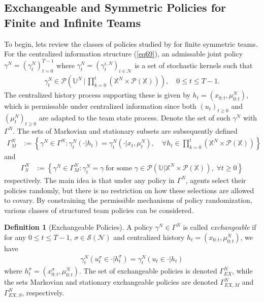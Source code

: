 \documentclass[12pt, oneside]{report}
\newcommand{\mbb}[1]{\mathbb{#1}}
\newcommand{\1}[1]{\mathbbm{1}_{\{#1\}}}
\newcommand{\mc}[1]{\mathcal{#1}}
\theoremstyle{definition}
\newtheorem{definition}[theorem]{Definition}
\begin{document}
\subsection{Exchangeable and Symmetric Policies for Finite and Infinite Teams}
To begin, lets review the classes of policies studied by
\cite{Sanjari_Saldi_Yüksel_2024} for finite symmetric teams. For the centralized
information structure (\ref{eq69}), an admissable joint policy
$\gamma^N=(\gamma^N_t)_{t=0}^{T-1}$ where
$\gamma^N_t=(\gamma^{i,N}_t)_{i\in\mc{N}}$ is a set of stochastic kernels such
that
\begin{align}
    \gamma^N_t\in\mc{P}\left(\mbb{U}^N\,\bigg|\,\prod_{k=0}^t(\mbb{X}^N\times\mc{P}(\mbb{X}))\right),\quad 0\leq t\leq T-1.
\end{align}
The centralized history process supporting these is given by
$h_t=(x_{0:t},\mu^N_{0:t})$, which is permissable under centralized information
since both $(u_t)_{t\geq 0}$ and $(\mu^N_t)_{t\geq 0}$ are adapted to the team
state process. Denote the set of such $\gamma^N$ with $\Gamma^N$. The sets of
Markovian and stationary subsets are subsequently defined
\begin{align}
    \Gamma^N_M&:=\left\{\gamma^N\in\Gamma^N:\gamma^N_t(\cdot|h_t)=\gamma^N_t(\cdot|x_t,\mu^N_t),\quad\forall h_t\in\prod_{k=0}^t(\mbb{X}^N\times\mc{P}(\mbb{X}))\right\}
\end{align}
and
\begin{align}
    \Gamma^N_S&:=\left\{\gamma^N\in\Gamma^N_M:\gamma^N_t=\gamma\;\text{for some $\gamma\in\mc{P}(\mbb{U}|\mbb{X}^N\times\mc{P}(\mbb{X}))$},\;\forall t\geq 0\right\}
\end{align}
respectively. The main idea is that under any policy in $\Gamma^N$, agents
select their policies randomly, but there is no restriction on how these
selections are allowed to covary. By constraining the permissible mechanisms of policy randomization, various classes
of structured team policies can be considered. 
\begin{definition}[Exchangeable Policies]\label{def29}
    A policy $\gamma^N\in\Gamma^N$ is called \textit{exchangeable} if for any $0\leq t\leq T-1$, $\sigma\in\mc{S}(\mc{N})$ and centralized history $h_t=(x_{0:t},\mu^N_{0:t})$, 
    we have
    \begin{align*}
        \gamma^{N}_t(u^\sigma_t\in\cdot|h^\sigma_t)=\gamma^N_t(u_t\in\cdot|h_t)
    \end{align*}
    where $h^\sigma_t=(x^\sigma_{0:t},\mu^N_{0:t})$. The set of exchangeable policies is denoted $\Gamma^N_{EX}$, while the sets Markovian and stationary exchangeable policies
    are denoted $\Gamma^N_{EX,M}$ and $\Gamma^N_{EX,S}$, respectively.
\end{definition}
\end{document}
